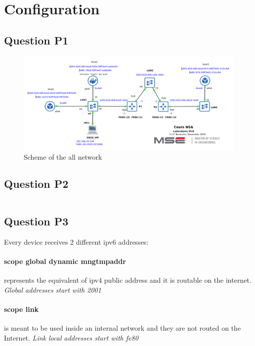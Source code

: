 \section{Configuration}

\subsection{Question P1}
\begin{figure}[H]
	\centering
	\includegraphics[width=\linewidth]{images/gns_ipv6s.png}
	\caption{Scheme of the all network}
	\label{fig:gns_network}
\end{figure}

\subsection{Question P2}

\inputminted{text}{files/P2_ipv6_Routers_tables.txt}
\label{conf:ips_routers}

\subsection{Question P3}
 Every device receives 2 different ipv6 addresses:
\paragraph{scope global dynamic mngtmpaddr} represents the equivalent of ipv4 public address and it is routable on the internet. \textit{Global addresses start with 2001}
\paragraph{scope link} is meant to be used inside an internal network and they are not routed on the Internet. \textit{Link local addresses start with fe80}

